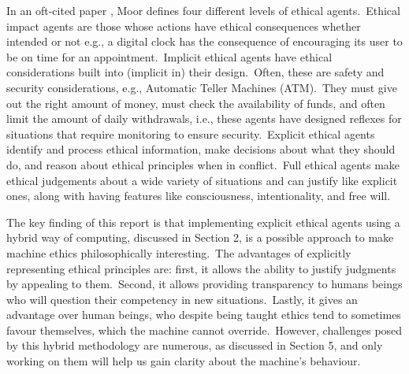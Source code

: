 \indent In an oft-cited paper \cite{1667948}, Moor defines four different levels of ethical agents.\ Ethical impact agents are those whose actions have ethical consequences whether intended or not e.g., a digital clock has the consequence of encouraging its user to be on time for an appointment.\ Implicit ethical agents have ethical considerations built into (implicit in) their design.\ Often, these are safety and security considerations, e.g., Automatic Teller Machines (ATM).\ They must give out the right amount of money, must check the availability of funds, and often limit the amount of daily withdrawals, i.e., these agents have designed reflexes for situations that require monitoring to ensure security.\ Explicit ethical agents identify and process ethical information, make decisions about what they should do, and reason about ethical principles when in conflict.\ Full ethical agents make ethical judgements about a wide variety of situations and can justify like explicit ones, along with having features like consciousness, intentionality, and free will.

\indent The key finding of this report is that implementing explicit ethical agents using a hybrid way of computing, discussed in Section 2, is a possible approach to make machine ethics philosophically interesting.\ The advantages of explicitly representing ethical principles are: first, it allows the ability to justify judgments by appealing to them.\ Second, it allows providing transparency to humans beings who will question their competency in new situations.\ Lastly, it gives an advantage over human beings, who despite being taught ethics tend to sometimes favour themselves, which the machine cannot override.\ However, challenges posed by this hybrid methodology are numerous, as discussed in Section 5, and only working on them will help us gain clarity about the machine's behaviour.